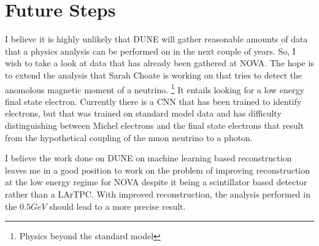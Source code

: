 \section{Future Steps}

I believe it is highly unlikely that DUNE will gather reasonable amounts of data that a physics analysis can be performed on in the next couple of years.
So, I wish to take a look at data that has already been gathered at NOVA.
The hope is to extend the analysis that Sarah Choate is working on that tries to detect  the anomolous magnetic moment of a neutrino.
\footnote{Physics beyond the standard model}
It entails looking for a low energy final state electron.
Currently there is a CNN that has been trained to identify electrons, but that was trained on standard model data and has difficulty distinguishing between Michel electrons and the final state electrons that result from the hypothetical coupling of the muon neutrino to a photon.

I believe the work done on DUNE on machine learning based reconstruction leaves me in a good position to work on the problem of improving reconstruction at the low energy regime for NOVA despite it being a scintillator based detector rather than a LArTPC.
With improved reconstruction, the analysis performed in the $0.5GeV$  should lead to a more precise result.